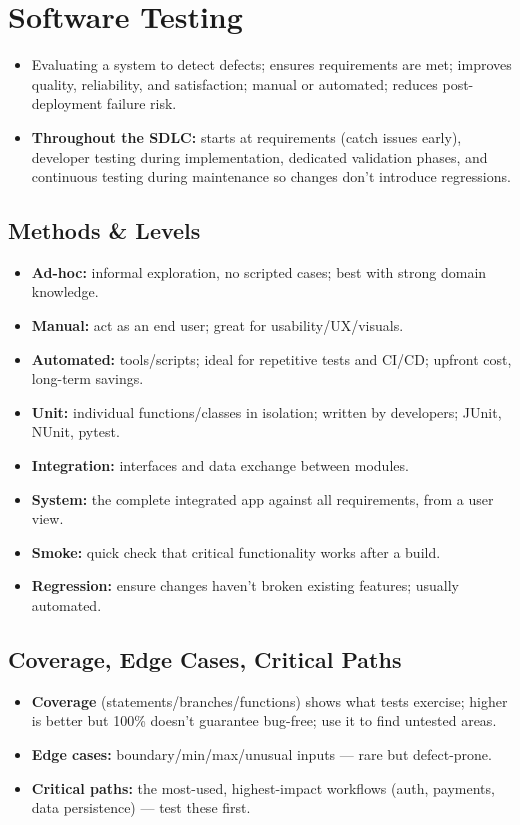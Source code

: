 \documentclass[hidelinks]{article}
\begin{document}
\section{Software Testing}
\begin{itemize}
  \item Evaluating a system to detect defects; ensures requirements are met; improves quality,
        reliability, and satisfaction; manual or automated; reduces post-deployment failure risk.
  \item \textbf{Throughout the SDLC:} starts at requirements (catch issues early), developer
        testing during implementation, dedicated validation phases, and continuous testing during
        maintenance so changes don't introduce regressions.
\end{itemize}

\subsection{Methods \& Levels}
\begin{itemize}
  \item \textbf{Ad-hoc:} informal exploration, no scripted cases; best with strong domain knowledge.
  \item \textbf{Manual:} act as an end user; great for usability/UX/visuals.
  \item \textbf{Automated:} tools/scripts; ideal for repetitive tests and CI/CD; upfront cost,
        long-term savings.
  \item \textbf{Unit:} individual functions/classes in isolation; written by developers; JUnit,
        NUnit, pytest.
  \item \textbf{Integration:} interfaces and data exchange between modules.
  \item \textbf{System:} the complete integrated app against all requirements, from a user view.
  \item \textbf{Smoke:} quick check that critical functionality works after a build.
  \item \textbf{Regression:} ensure changes haven't broken existing features; usually automated.
\end{itemize}

\subsection{Coverage, Edge Cases, Critical Paths}
\begin{itemize}
  \item \textbf{Coverage} (statements/branches/functions) shows what tests exercise; higher is
        better but 100\% doesn't guarantee bug-free; use it to find untested areas.
  \item \textbf{Edge cases:} boundary/min/max/unusual inputs --- rare but defect-prone.
  \item \textbf{Critical paths:} the most-used, highest-impact workflows (auth, payments, data
        persistence) --- test these first.
\end{itemize}
\end{document}
